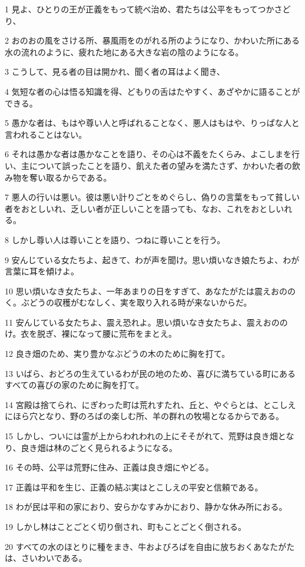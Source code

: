 \par 1 見よ、ひとりの王が正義をもって統べ治め、君たちは公平をもってつかさどり、
\par 2 おのおの風をさける所、暴風雨をのがれる所のようになり、かわいた所にある水の流れのように、疲れた地にある大きな岩の陰のようになる。
\par 3 こうして、見る者の目は開かれ、聞く者の耳はよく聞き、
\par 4 気短な者の心は悟る知識を得、どもりの舌はたやすく、あざやかに語ることができる。
\par 5 愚かな者は、もはや尊い人と呼ばれることなく、悪人はもはや、りっぱな人と言われることはない。
\par 6 それは愚かな者は愚かなことを語り、その心は不義をたくらみ、よこしまを行い、主について誤ったことを語り、飢えた者の望みを満たさず、かわいた者の飲み物を奪い取るからである。
\par 7 悪人の行いは悪い。彼は悪い計りごとをめぐらし、偽りの言葉をもって貧しい者をおとしいれ、乏しい者が正しいことを語っても、なお、これをおとしいれる。
\par 8 しかし尊い人は尊いことを語り、つねに尊いことを行う。
\par 9 安んじている女たちよ、起きて、わが声を聞け。思い煩いなき娘たちよ、わが言葉に耳を傾けよ。
\par 10 思い煩いなき女たちよ、一年あまりの日をすぎて、あなたがたは震えおののく。ぶどうの収穫がむなしく、実を取り入れる時が来ないからだ。
\par 11 安んじている女たちよ、震え恐れよ。思い煩いなき女たちよ、震えおののけ。衣を脱ぎ、裸になって腰に荒布をまとえ。
\par 12 良き畑のため、実り豊かなぶどうの木のために胸を打て。
\par 13 いばら、おどろの生えているわが民の地のため、喜びに満ちている町にあるすべての喜びの家のために胸を打て。
\par 14 宮殿は捨てられ、にぎわった町は荒れすたれ、丘と、やぐらとは、とこしえにほら穴となり、野のろばの楽しむ所、羊の群れの牧場となるからである。
\par 15 しかし、ついには霊が上からわれわれの上にそそがれて、荒野は良き畑となり、良き畑は林のごとく見られるようになる。
\par 16 その時、公平は荒野に住み、正義は良き畑にやどる。
\par 17 正義は平和を生じ、正義の結ぶ実はとこしえの平安と信頼である。
\par 18 わが民は平和の家におり、安らかなすみかにおり、静かな休み所におる。
\par 19 しかし林はことごとく切り倒され、町もことごとく倒される。
\par 20 すべての水のほとりに種をまき、牛およびろばを自由に放ちおくあなたがたは、さいわいである。


